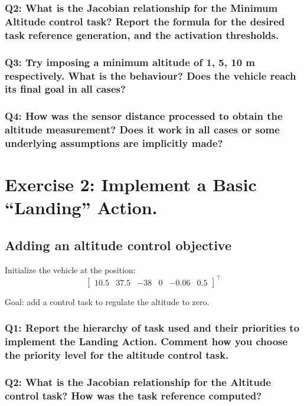 \documentclass{article}
\begin{document}
\subsubsection{Q2: What is the Jacobian relationship for the Minimum Altitude control task? Report the formula for the desired task reference generation, and the activation thresholds.}

\subsubsection{Q3: Try imposing a minimum altitude of 1, 5, 10 m respectively. What is the behaviour? Does the vehicle reach its final goal in all cases?}

\subsubsection{Q4: How was the sensor distance processed to obtain the altitude measurement? Does it work in all cases or some underlying assumptions are implicitly made?}

\clearpage

\section{Exercise 2: Implement a Basic “Landing” Action.}
\subsection{Adding an altitude control objective}
Initialize the vehicle at the position:
\begin{displaymath}
\begin{bmatrix} 10.5 & 37.5 & -38 & 0 & -0.06 & 0.5 \end{bmatrix}^\top
\end{displaymath}

Goal: add a control task to regulate the altitude to zero.

\subsubsection{Q1: Report the hierarchy of task used and their priorities to implement the Landing Action. Comment how you choose the priority level for the altitude control task.}

\subsubsection{Q2: What is the Jacobian relationship for the Altitude control task? How was the task reference computed?}
\end{document}
